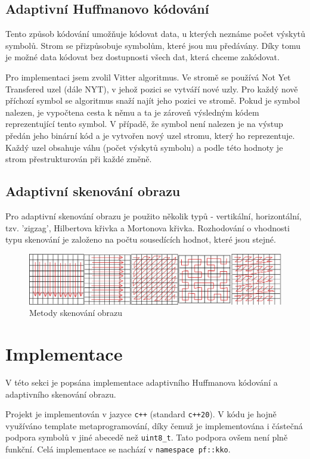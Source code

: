 \documentclass[12pt,a4paper,titlepage,final]{report}
\begin{document}
\subsection{Adaptivní Huffmanovo kódování}
Tento způsob kódování umožňuje kódovat data, u kterých neznáme počet výskytů symbolů. Strom se přizpůsobuje symbolům, které jsou mu předávány. Díky tomu je možné data kódovat bez dostupnosti všech dat, která chceme zakódovat.

Pro implementaci jsem zvolil Vitter algoritmus. Ve stromě se používá Not Yet Transfered uzel (dále NYT), v jehož pozici se vytváří nové uzly. Pro každý nově příchozí symbol se algoritmus snaží najít jeho pozici ve stromě. Pokud je symbol nalezen, je vypočtena cesta k němu a ta je zároveň výsledným kódem reprezentující tento symbol. V případě, že symbol není nalezen je na výstup předán jeho binární kód a je vytvořen nový uzel stromu, který ho reprezentuje. Každý uzel obsahuje váhu (počet výskytů symbolu) a podle této hodnoty je strom přestrukturován při každé změně. 

\subsection{Adaptivní skenování obrazu}

Pro adaptivní skenování obrazu je použito několik typů - vertikální, horizontální, tzv. 'zigzag', Hilbertova křivka a Mortonova křivka. Rozhodování o vhodnosti typu skenování je založeno na počtu sousedících hodnot, které jsou stejné.

\begin{figure}[H]
    \centering
    \includegraphics[scale=0.3]{images/scanning.png}
    \caption{Metody skenování obrazu}
    \label{fig:scanning}
\end{figure}

\section{Implementace}
V této sekci je popsána implementace adaptivního Huffmanova kódování a adaptivního skenování obrazu. 

Projekt je implementován v jazyce \texttt{c++} (standard \texttt{c++20}). V kódu je hojně využíváno template metaprogramování, díky čemuž je implementována i částečná podpora symbolů v jiné abecedě než \texttt{uint8\_t}. Tato podpora ovšem není plně funkční. Celá implementace se nachází v \texttt{namespace pf::kko}.
\end{document}
